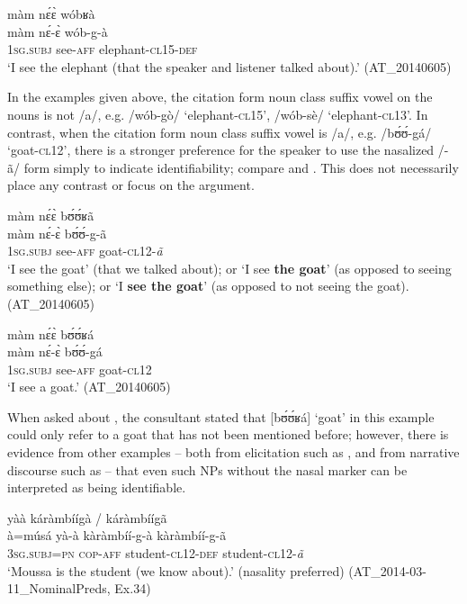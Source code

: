 \documentclass[output=paper]{langsci/langscibook}
\begin{document}
\ea\label{ex:teo:47}
\glll màm  n\'ɛ\`ɛ wóbʁà\\
 màm n\'ɛ-\`ɛ wób-g-à\\
1\textsc{sg.subj} see-\textsc{aff} elephant-\textsc{cl15-def}\\
\glt ‘I see the elephant (that the speaker and listener talked about).’ (AT\_20140605)
\z

In the examples given above, the citation form noun class suffix vowel on the nouns is not /a/, e.g. /wób-gò/ ‘elephant-\textsc{cl15}’, /wób-sè/ ‘elephant-\textsc{cl13}’. In contrast, when the citation form noun class suffix vowel is /a/, e.g. /b\'ʊ\'ʊ-gá/ ‘goat-\textsc{cl12}’, there is a stronger preference for the speaker to use the nasalized /-ã/ form simply to indicate identifiability; compare  and . This does not necessarily place any contrast or focus on the argument.


\ea\label{ex:teo:48}
\glll màm  n\'ɛ\`ɛ b\'ʊ\'ʊʁã\\
màm n\'ɛ-\`ɛ b\'ʊ\'ʊ-g-ã\\
\textsc{1sg.subj} see-\textsc{aff} goat-\textsc{cl12}-\textit{ã}\\
\glt ‘I see the goat’ (that we talked about); or ‘I see \textbf{the goat}’ (as opposed to seeing something else); or ‘I \textbf{see the goat}’ (as opposed to not seeing the goat). (AT\_20140605)
\z

\ea\label{ex:teo:49}
\glll màm n\'ɛ\`ɛ b\'ʊ\'ʊʁá\\
màm n\'ɛ-\`ɛ b\'ʊ\'ʊ-gá\\
\textsc{1sg.subj} see-\textsc{aff} goat-\textsc{cl12}\\
\glt ‘I see a goat.’ (AT\_20140605)
\z

When asked about , the consultant stated that [b\'ʊ\'ʊʁá] ‘goat’ in this example could only refer to a goat that has not been mentioned before; however, there is evidence from other examples – both from elicitation such as , and from narrative discourse such as  – that even such NPs without the nasal marker can be interpreted as being identifiable.

\ea\label{ex:teo:50}
 yàà {káràmbíígà /} {káràmbíígã} \\
à=músá yà-à kàràmbíí-g-à kàràmbíí-g-ã\\
\textsc{3sg.subj=pn} \textsc{cop-aff} student-\textsc{cl12-def} student-\textsc{cl12}-\textit{ã}\\
\glt ‘Moussa is the student (we know about).’ (nasality preferred) (AT\_2014-03-11\_NominalPreds, Ex.34)
\z
\end{document}
